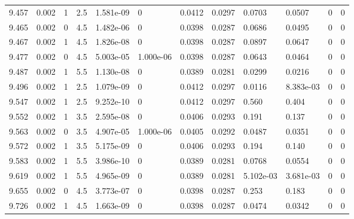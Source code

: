 \documentclass[preview]{standalone}
\begin{document}
{{{{{{\begin{tabular}{L{1.2cm}C{1.2cm} C{0.3cm}C{0.5cm} C{1.4cm}C{1.4cm} C{1.4cm}C{1.4cm} C{1.6cm}C{1.6cm} C{1.6cm}C{1.6cm}}
  9.457  &  0.002  & 1     & 2.5 &  1.581e-09  & 0  &  0.0412&   0.0297& 0.0703 & 0.0507   &  0 & 0  \\ 
  9.465  &  0.002  & 0     & 4.5 &  1.482e-06  & 0  &  0.0398&   0.0287& 0.0686 & 0.0495   &  0 & 0  \\ 
  9.467  &  0.002  & 1     & 4.5 &  1.826e-08  & 0  &  0.0398&   0.0287& 0.0897 & 0.0647   &  0 & 0  \\ 
  9.477  &  0.002  & 0     & 4.5 &  5.003e-05  & 1.000e-06  &  0.0398&   0.0287& 0.0643 & 0.0464   &  0 & 0  \\ 
  9.487  &  0.002  & 1     & 5.5 &  1.130e-08  & 0  &  0.0389&   0.0281& 0.0299 & 0.0216   &  0 & 0  \\ 
  9.496  &  0.002  & 1     & 2.5 &  1.079e-09  & 0  &  0.0412&   0.0297& 0.0116 & 8.383e-03   &  0 & 0  \\ 
  9.547  &  0.002  & 1     & 2.5 &  9.252e-10  & 0  &  0.0412&   0.0297& 0.560 & 0.404   &  0 & 0  \\ 
  9.552  &  0.002  & 1     & 3.5 &  2.595e-08  & 0  &  0.0406&   0.0293& 0.191 & 0.137   &  0 & 0  \\ 
  9.563  &  0.002  & 0     & 3.5 &  4.907e-05  & 1.000e-06  &  0.0405&   0.0292& 0.0487 & 0.0351   &  0 & 0  \\ 
  9.572  &  0.002  & 1     & 3.5 &  5.175e-09  & 0  &  0.0406&   0.0293& 0.194 & 0.140   &  0 & 0  \\ 
  9.583  &  0.002  & 1     & 5.5 &  3.986e-10  & 0  &  0.0389&   0.0281& 0.0768 & 0.0554   &  0 & 0  \\ 
  9.619  &  0.002  & 1     & 5.5 &  4.965e-09  & 0  &  0.0389&   0.0281& 5.102e-03 & 3.681e-03   &  0 & 0  \\ 
  9.655  &  0.002  & 0     & 4.5 &  3.773e-07  & 0  &  0.0398&   0.0287& 0.253 & 0.183   &  0 & 0  \\ 
  9.726  &  0.002  & 1     & 4.5 &  1.663e-09  & 0  &  0.0398&   0.0287& 0.0474 & 0.0342   &  0 & 0  \\ 
\hline 
\end{tabular} 

}}}}}}
\end{document}
